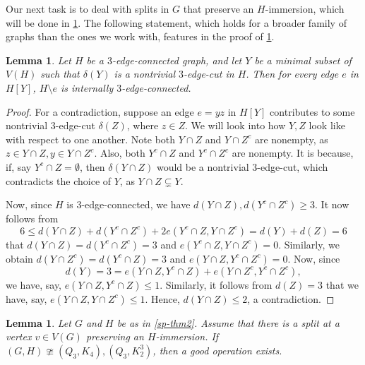 \documentclass[letterpaper,11pt]{article}
\newtheorem{lemma}[theorem]{Lemma}
\theoremstyle{definition}
\begin{document}
Our next task is to deal with splits in $G$ that preserve an $H$-immersion, which will be done in \cref{lem10}. The following statement, which holds for a broader family of graphs than the ones we work with, features in the proof of \cref{lem10}.
\begin{lemma}
\label{3econdel}
Let $H$ be a $3$-edge-connected graph, and let $Y$ be a minimal subset of $V(H)$ such that $\delta(Y)$ is a nontrivial $3$-edge-cut in $H$. Then for every edge $e$ in $H[Y]$, $H\setminus e$ is internally $3$-edge-connected.
\end{lemma}
\begin{proof}
For a contradiction, suppose an edge $e=yz$ in $H[Y]$ contributes to some nontrivial $3$-edge-cut $\delta(Z)$, where $z\in Z$. We will look into how $Y,Z$ look like with respect to one another. Note both $Y\cap Z$ and $Y\cap Z^c$ are nonempty, as $z\in Y\cap Z, y\in Y\cap Z^c$. Also, both $Y^c\cap Z$ and $Y^c\cap Z^c$ are nonempty. It is because, if, say $Y^c\cap Z=\emptyset$, then  $\delta(Y\cap Z)$ would be a nontrivial $3$-edge-cut, which contradicts the choice of $Y$, as $Y\cap Z\subsetneq Y$.

Now, since $H$ is $3$-edge-connected, we have $d(Y\cap Z),d(Y^c\cap Z^c)\ge 3$. It now follows from
$$6 \le d(Y\cap Z)+d(Y^c\cap Z^c)+2e(Y^c\cap Z, Y\cap Z^c)=d(Y)+d(Z) = 6$$
 that $d(Y\cap Z)=d(Y^c\cap Z^c)=3$ and $e(Y^c\cap Z, Y\cap Z^c)=0$. Similarly, we obtain $d(Y\cap Z^c)=d(Y^c\cap Z)=3$ and $e(Y\cap Z, Y^c\cap Z^c)=0$. Now, since
 $$d(Y)=3=e(Y\cap Z, Y^c\cap Z)+e(Y\cap Z^c,Y^c\cap Z^c),$$
  we have, say, $e(Y\cap Z, Y^c\cap Z)\le 1$. Similarly, it follows from $d(Z)=3$ that we have, say, $e(Y\cap Z, Y\cap Z^c)\le 1$. Hence, $d(Y\cap Z)\le 2$, a contradiction.
\end{proof}
\begin{lemma}
\label{lem10}
Let $G$ and $H$ be as in \cref{sp-thm2}. Assume that there is a split at a vertex $v \in V(G)$ preserving an $H$-immersion. If $(G, H) \ncong (Q_3, K_4), (Q_3, K_2^3)$, then a good operation exists.
\end{lemma}
\end{document}
